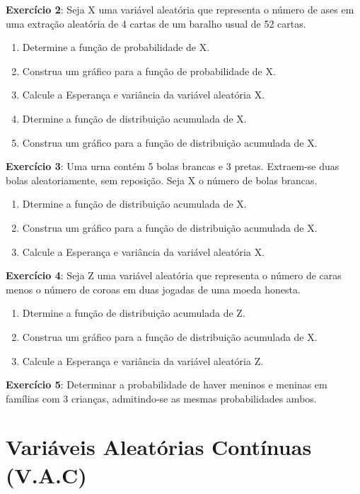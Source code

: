 
\textbf{Exercício 2}: Seja X uma variável aleatória que representa
o número de ases em uma extração aleatória de 4 cartas de um
baralho usual de 52 cartas.

\begin{enumerate}
    \item Determine a função de probabilidade de X.
    \item Construa um gráfico para a função de probabilidade de X.
    \item Calcule a Esperança e variância da variável aleatória X.
    \item Dtermine a função de distribuição acumulada de X.
    \item Construa um gráfico para a função de distribuição acumulada de X.
\end{enumerate}

\textbf{Exercício 3}: Uma urna contém 5 bolas brancas e 3 pretas.
Extraem-se duas bolas aleatoriamente, sem reposição. Seja X o
número de bolas brancas.

\begin{enumerate}
    \item Dtermine a função de distribuição acumulada de X.
    \item Construa um gráfico para a função de distribuição acumulada de X.
    \item Calcule a Esperança e variância da variável aleatória X.
\end{enumerate}

\textbf{Exercício 4}: Seja Z uma variável aleatória que representa
o número de caras menos o número de coroas em duas jogadas de uma
moeda honesta.

\begin{enumerate}
    \item Dtermine a função de distribuição acumulada de Z.
    \item Construa um gráfico para a função de distribuição acumulada de X.
    \item Calcule a Esperança e variância da variável aleatória Z.
\end{enumerate}

\textbf{Exercício 5}: Determinar a probabilidade de haver meninos
e meninas em famílias com 3 crianças, admitindo-se as mesmas
probabilidades ambos.

\newpage

\section{Variáveis Aleatórias Contínuas (V.A.C)}

